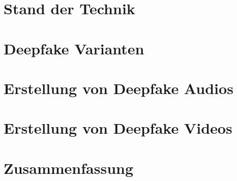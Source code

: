 % 
\chapter{Stand der Technik}\label{ch:stand-der-technik}





\chapter{Deepfake Varianten}\label{ch:deepfake-varianten}


\chapter{Erstellung von Deepfake Audios}\label{ch:erstellung-von-deepfake-audios}



\chapter{Erstellung von Deepfake Videos}\label{ch:erstellung-von-deepfake-videos}






\chapter{Zusammenfassung}\label{ch:zusammenfassung}
